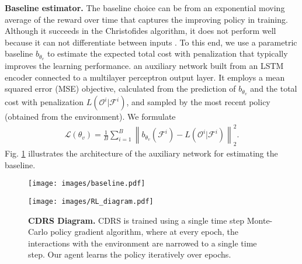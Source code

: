\textbf{Baseline estimator.} The baseline choice can be from an exponential moving average of the reward over time that captures the improving policy in training. Although it succeeds in the Christofides algorithm, it does not perform well because it can not differentiate between inputs \cite{neural_bello}. To this end, we use a parametric baseline $b_{\theta_v}$ to estimate the expected total cost with penalization that typically improves the learning performance.  an auxiliary network built from an LSTM encoder connected to a multilayer perceptron output layer.  It employs a mean squared error (MSE) objective, calculated from the prediction of $b_{\theta_v}$ and the total cost with penalization $L(\mathcal{O}^i | \mathcal{F}^i)$, and sampled by the most recent policy (obtained from the environment). We formulate 
\begin{align} \label{eq:aux_mse}
	\mathcal{L}(\theta_v) = \frac{1}{B} \sum_{i=1}^{B} \left\| b_{\theta_v}(\mathcal{F}^i) - L(\mathcal{O}^i | \mathcal{F}^i) \right\|_2^2.
\end{align}
%
Fig. \ref{fig:baseline} illustrates the architecture of the auxiliary network for estimating the baseline. 
%
%
%
\begin{figure}[t!] 
	\centering
	\texttt{[image: images/baseline.pdf]}   
	\caption{\small{}  } 
	\label{fig:baseline}
\end{figure}
%
%
%  
%
%
\begin{figure}[t!] 
	\centering
	\texttt{[image: images/RL\_diagram.pdf]}   
	\caption{\small\textbf{CDRS Diagram.} CDRS is trained using a single time step Monte-Carlo policy gradient algorithm, where at every epoch, the interactions with the environment are narrowed to a single time step. Our agent learns the policy iteratively over epochs.} 
	\label{fig:rl_diagram}
	\vspace{-3mm}
\end{figure}
